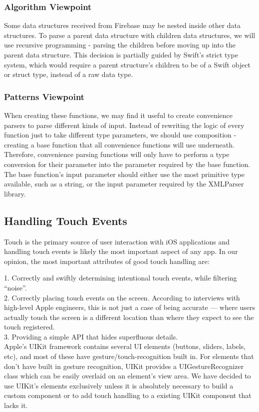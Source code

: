 \documentclass[letterpaper,10pt,titlepage]{article}
\begin{document}
\subsubsection{Algorithm Viewpoint}
Some data structures received from Firebase may be nested inside other data structures. To parse a parent data structure with children data structures, we will use recursive programming - parsing the children before moving up into the parent data structure. This decision is partially guided by Swift's strict type system, which would require a parent structure's children to be of a Swift object or struct type, instead of a raw data type.

\subsubsection{Patterns Viewpoint}
When creating these functions, we may find it useful to create convenience parsers to parse different kinds of input. Instead of rewriting the logic of every function just to take different type parameters, we should use composition - creating a base function that all convenience functions will use underneath. Therefore, convenience parsing functions will only have to perform a type conversion for their parameter into the parameter required by the base function. The base function's input parameter should either use the most primitive type available, such as a string, or the input parameter required by the XMLParser library.


\subsection{Handling Touch Events}
Touch is the primary source of user interaction with iOS applications and handling touch events is likely the most important aspect of any app. In our opinion, the most important attributes of good touch handling are:

1. Correctly and swiftly determining intentional touch events, while filtering “noise”.\\
2. Correctly placing touch events on the screen. According to interviews with high-level Apple engineers\cite{touchpara1}, this is not just a case of being accurate — where users actually touch the screen is a different location than where they expect to see the touch registered.\\
3. Providing a simple API that hides superfluous details.\\

Apple’s UIKit framework contains several UI elements (buttons, sliders, labels, etc), and most of these have gesture/touch-recognition built in. For elements that don’t have built in gesture recognition, UIKit provides a UIGestureRecognizer class which can be easily overlaid on an element’s view area.
We have decided to use UIKit's elements exclusively unless it is absolutely necessary to build a custom component or to add touch handling to a existing UIKit component that lacks it.
\end{document}
